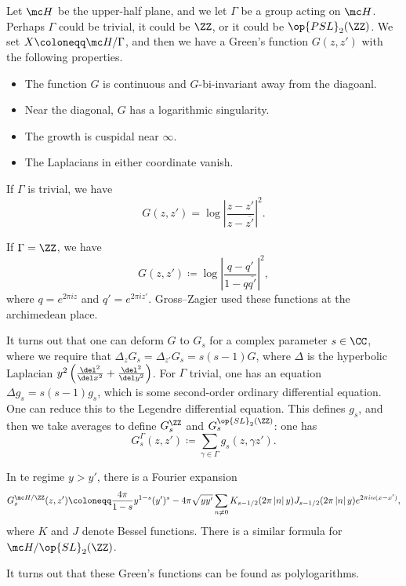 \documentclass{article}
\begin{document}
Let $\mc H$ be the upper-half plane, and we let $\Gamma$ be a group acting on $\mc H$. Perhaps $\Gamma$ could be trivial, it could be $\ZZ$, or it could be $\op{PSL}_2(\ZZ)$. We set $X\coloneqq\mc H/\Gamma$, and then we have a Green's function $G(z,z')$ with the following properties.
\begin{itemize}
	\item The function $G$ is continuous and $G$-bi-invariant away from the diagoanl.
	\item Near the diagonal, $G$ has a logarithmic singularity.
	\item The growth is cuspidal near $\infty$.
	\item The Laplacians in either coordinate vanish.
\end{itemize}
\begin{example}
	If $\Gamma$ is trivial, we have
	\[G(z,z')=\log\left|\frac{z-z'}{z-\overline{z'}}\right|^2.\]
\end{example}
\begin{example}
	If $\Gamma=\ZZ$, we have
	\[G(z,z')\coloneqq\log\left|\frac{q-q'}{1-q\overline{q'}}\right|^2,\]
	where $q=e^{2\pi iz}$ and $q'=e^{2\pi iz'}$. Gross--Zagier used these functions at the archimedean place.
\end{example}
It turns out that one can deform $G$ to $G_s$ for a complex parameter $s\in\CC$, where we require that $\Delta_zG_s=\Delta_{z'}G_s=s(s-1)G$, where $\Delta$ is the hyperbolic Laplacian $y^2\left(\frac{\del^2}{\del x^2}+\frac{\del^2}{\del y^2}\right)$. For $\Gamma$ trivial, one has an equation $\Delta g_s=s(s-1)g_s$, which is some second-order ordinary differential equation. One can reduce this to the Legendre differential equation. This defines $g_s$, and then we take averages to define $G_s^\ZZ$ and $G_s^{\op{SL}_2(\ZZ)}$: one has
\[G_s^\Gamma(z,z')\coloneqq\sum_{\gamma\in\Gamma}g_s(z,\gamma z').\]
\begin{example}
	In te regime $y>y'$, there is a Fourier expansion
	\[G_s^{\mc H/\ZZ}(z,z')\coloneqq\frac{4\pi}{1-s}y^{1-s}(y')^s-4\pi\sqrt{yy'}\sum_{n\ne0}K_{s-1/2}(2\pi\left|n\right|y)J_{s-1/2}(2\pi\left|n\right|y)e^{2\pi in(x-x')},\]
	where $K$ and $J$ denote Bessel functions. There is a similar formula for $\mc H/\op{SL}_2(\ZZ)$.
\end{example}
It turns out that these Green's functions can be found as polylogarithms.
\end{document}
